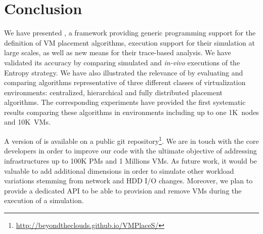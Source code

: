 \section{Conclusion}
\label{sec:conclusion}

We have presented \vmps, a framework providing generic programming
support for the definition of VM placement algorithms, execution
support for their simulation at large scales, as well as new means for
their trace-based analysis.
We have validated its accuracy by comparing simulated and
\textit{in-vivo} executions of the Entropy strategy.
We have also illustrated the relevance of \vmps by evaluating and
comparing algorithms representative of three different classes of
virtualization environments: centralized, hierarchical and fully
distributed placement algorithms.
The corresponding experiments have provided the first systematic results
comparing these algorithms in environments including up to one
1K~nodes and 10K~VMs.

A version of \vmps is available on a public git
repository\footnote{\url{http://beyondtheclouds.github.io/VMPlaceS/}}.
We are in touch with the \sg core developers in order to improve our
code with the ultimate objective of addressing infrastructures up to
100K PMs and 1 Millions VMs. As future work, it would be valuable to add
additional dimensions in order to simulate other workload variations
stemming from network and HDD I/O changes. Moreover,
we plan to provide a dedicated API to be able to
provision and remove VMs during the execution of a simulation.



